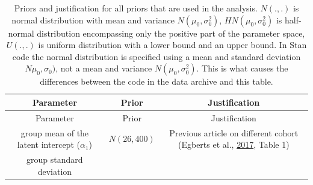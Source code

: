 \documentclass[openright,titlepage,12pt,a4paper]{book}
\begin{document}
\newpage

\footnotesize

\begin{longtable}[]{@{}ccc@{}}
\caption{\label{tab:ch05tab1} Priors and justification for all priors that are used in the analysis. \(N(.,.)\) is normal distribution with mean and variance \(N(\mu_0,\sigma_0^2)\), \(HN(\mu_0, \sigma_0^2)\) is half-normal distribution encompassing only the positive part of the parameter space, \(U(.,.)\) is uniform distribution with a lower bound and an upper bound. In Stan code the normal distribution is specified using a mean and standard deviation \(N\mu_0, \sigma_0)\), not a mean and variance \(N(\mu_0, \sigma_0^2)\). This is what causes the differences between the code in the data archive and this table.}\tabularnewline
\toprule
\begin{minipage}[b]{0.29\columnwidth}\centering
Parameter\strut
\end{minipage} & \begin{minipage}[b]{0.16\columnwidth}\centering
Prior\strut
\end{minipage} & \begin{minipage}[b]{0.45\columnwidth}\centering
Justification\strut
\end{minipage}\tabularnewline
\midrule
\endfirsthead
\toprule
\begin{minipage}[b]{0.29\columnwidth}\centering
Parameter\strut
\end{minipage} & \begin{minipage}[b]{0.16\columnwidth}\centering
Prior\strut
\end{minipage} & \begin{minipage}[b]{0.45\columnwidth}\centering
Justification\strut
\end{minipage}\tabularnewline
\midrule
\endhead
\begin{minipage}[t]{0.29\columnwidth}\centering
group mean of the latent
intercept (\(\alpha_1\))\strut
\end{minipage} & \begin{minipage}[t]{0.16\columnwidth}\centering
\(N(26, 400)\)\strut
\end{minipage} & \begin{minipage}[t]{0.45\columnwidth}\centering
Previous article on different
cohort (Egberts et al., \protect\hyperlink{ref-egberts_parents_2017}{2017}, Table 1)\strut
\end{minipage}\tabularnewline
\begin{minipage}[t]{0.29\columnwidth}\centering
group standard deviation

\end{minipage}
\end{longtable}
\end{document}
